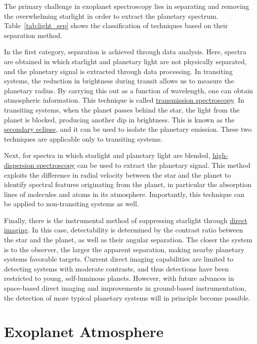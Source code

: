 \documentclass[a4paper,twocolumn]{report}
\begin{document}
The primary challenge in exoplanet spectroscopy lies in separating and removing the overwhelming starlight in order to extract the planetary spectrum. Table~\ref{tab:light_sep} shows the classification of techniques based on their separation method.  

In the first category, separation is achieved through data analysis. Here, spectra are obtained in which starlight and planetary light are not physically separated, and the planetary signal is extracted through data processing. In transiting systems, the reduction in brightness during transit allows us to measure the planetary radius. By carrying this out as a function of wavelength, one can obtain atmospheric information. This technique is called \underline{transmission spectroscopy}. In transiting systems, when the planet passes behind the star, the light from the planet is blocked, producing another dip in brightness. This is known as the \underline{secondary eclipse}, and it can be used to isolate the planetary emission. These two techniques are applicable only to transiting systems.  

Next, for spectra in which starlight and planetary light are blended, \underline{high-dispersion spectroscopy} can be used to extract the planetary signal. This method exploits the difference in radial velocity between the star and the planet to identify spectral features originating from the planet, in particular the absorption lines of molecules and atoms in its atmosphere. Importantly, this technique can be applied to non-transiting systems as well.  

Finally, there is the instrumental method of suppressing starlight through \underline{direct imaging}. In this case, detectability is determined by the contrast ratio between the star and the planet, as well as their angular separation. The closer the system is to the observer, the larger the apparent separation, making nearby planetary systems favorable targets. Current direct imaging capabilities are limited to detecting systems with moderate contrasts, and thus detections have been restricted to young, self-luminous planets. However, with future advances in space-based direct imaging and improvements in ground-based instrumentation, the detection of more typical planetary systems will in principle become possible.  





\chapter{Exoplanet Atmosphere}




\end{document}
